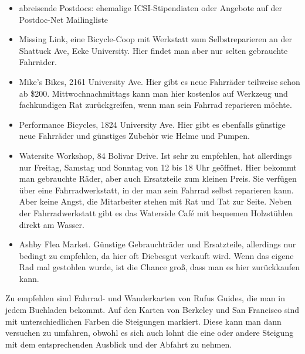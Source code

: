 \documentclass[a4paper]{scrreprt}
\begin{document}
\begin{itemize}

\item abreisende Postdocs: ehemalige ICSI-Stipendiaten oder Angebote auf der Postdoc-Net Mailingliste

\item Missing Link, eine Bicycle-Coop mit Werkstatt zum Selbstreparieren an der Shattuck Ave, Ecke University. Hier findet man aber nur selten gebrauchte Fahrräder.

\item Mike's Bikes, 2161 University Ave. Hier gibt es neue Fahrräder teilweise schon ab \$200. Mittwochnachmittags kann man hier kostenlos auf Werkzeug und fachkundigen Rat zurückgreifen, wenn man sein Fahrrad reparieren möchte.

\item Performance Bicycles, 1824 University Ave. Hier gibt es ebenfalls günstige neue Fahrräder und günstiges Zubehör wie Helme und Pumpen. 

\item Watersite Workshop, 84 Bolivar Drive. Ist sehr zu empfehlen, hat allerdings nur Freitag, Samstag und Sonntag von 12 bis 18 Uhr geöffnet. Hier bekommt man gebrauchte Räder, aber auch Ersatzteile   zum kleinen Preis. Sie verfügen über eine Fahrradwerkstatt, in der man sein Fahrrad selbst reparieren kann. Aber keine Angst, die Mitarbeiter stehen mit Rat und Tat zur Seite. Neben der Fahrradwerkstatt gibt es das Waterside Café mit bequemen Holzstühlen direkt am Wasser. 

\item Ashby Flea Market. Günstige Gebrauchträder und Ersatzteile, allerdings nur bedingt zu empfehlen, da hier oft Diebesgut verkauft wird. Wenn das eigene Rad mal gestohlen wurde, ist die Chance groß, dass man es hier zurückkaufen kann.

\end{itemize}

Zu empfehlen sind Fahrrad- und Wanderkarten von Rufus Guides, die man in jedem Buchladen bekommt. 
Auf den Karten von Berkeley und San Francisco sind mit unterschiedlichen Farben die Steigungen markiert. 
Diese kann man dann versuchen zu umfahren, obwohl es sich auch lohnt die eine oder andere Steigung mit dem entsprechenden Ausblick und der Abfahrt zu nehmen. 
\end{document}
